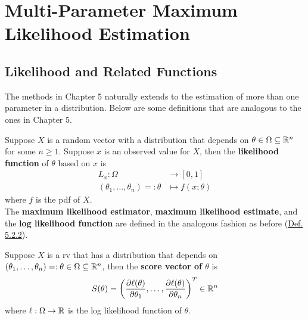 \documentclass[11pt,fleqn]{book} %
\begin{document}



\chapter{Multi-Parameter Maximum Likelihood Estimation}


\section{Likelihood and Related Functions}

\begin{remark} \label{rmk:611}
The methods in Chapter 5 naturally extends to the estimation of more than one parameter in a distribution. Below are some definitions that are analogous to the ones in Chapter 5.
\end{remark}

\begin{definition} \label{def:612}
Suppose \(X\) is a random vector with a distribution that depends on \(\theta \in \Omega \subseteq \mathbb{R}^n\) for some \(n \geq 1\). Suppose \(x\) is an observed value for \(X\), then the \textbf{likelihood function} of \(\theta\) based on \(x\) is
\[
\begin{aligned}
L_x: \Omega &\rightarrow [0, 1] \\
(\theta_1, \ldots, \theta_n) =: \theta &\mapsto f(x; \theta)
\end{aligned}
\]
where \(f\) is the pdf of \(X\). \\
\indent The \textbf{maximum likelihood estimator}, \textbf{maximum likelihood estimate}, and the \textbf{log likelihood function} are defined in the analogous fashion as before (\hyperref[def:522]{Def. 5.2.2}).
\end{definition}

\begin{definition} \label{def:613}
Suppose \(X\) is a rv that has a distribution that depends on \((\theta_1, \ldots, \theta_n) =: \theta \in \Omega \subseteq \mathbb{R}^n\), then the \textbf{score vector of \(\theta\)} is
\[
S(\theta) = \left(\frac{\partial\ell(\theta)}{\partial\theta_1}, \ldots, \frac{\partial\ell(\theta)}{\partial\theta_n}\right)^T \in \mathbb{R}^n
\]
where \(\ell:\Omega\rightarrow\mathbb{R}\) is the log likelihood function of \(\theta\).
\end{definition}
\end{document}

